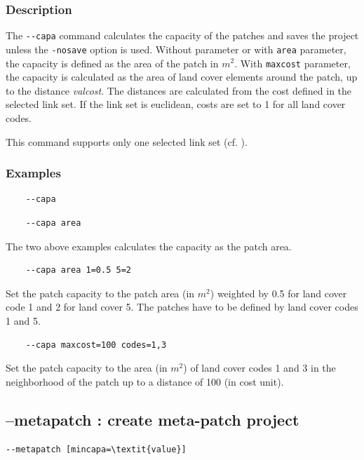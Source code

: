 \documentclass[a4paper,10pt]{report}
\begin{document}
\subsubsection{Description}
The \verb|--capa| command calculates the capacity of the patches and saves the project unless the \verb|-nosave| option is used. Without parameter or with \verb|area| parameter, the capacity is defined as the area of the patch in $m^2$. With \verb|maxcost| parameter, the capacity is calculated as the area of land cover elements around the patch, up to the distance \textit{valcost}.
The distances are calculated from the cost defined in the selected link set. If the link set is euclidean, costs are set to 1 for all land cover codes.

This command supports only one selected link set (cf. ).

\subsubsection{Examples}

\begin{Verbatim}
	--capa
\end{Verbatim}
\begin{Verbatim}
	--capa area
\end{Verbatim}
The two above examples calculates the capacity as the patch area.

\begin{Verbatim}
	--capa area 1=0.5 5=2
\end{Verbatim}
Set the patch capacity to the patch area (in $m^2$) weighted by 0.5 for land cover code 1 and 2 for land cover 5. The patches have to be defined by land cover codes 1 and 5.

\begin{Verbatim}
	--capa maxcost=100 codes=1,3
\end{Verbatim}
Set the patch capacity to the area (in $m^2$) of land cover codes 1 and 3 in the neighborhood of the patch up to a distance of 100 (in cost unit).


\subsection{--metapatch : create meta-patch project}
\begin{Verbatim}[commandchars=\\\{\}]
--metapatch [mincapa=\textit{value}]
\end{Verbatim}
\end{document}
